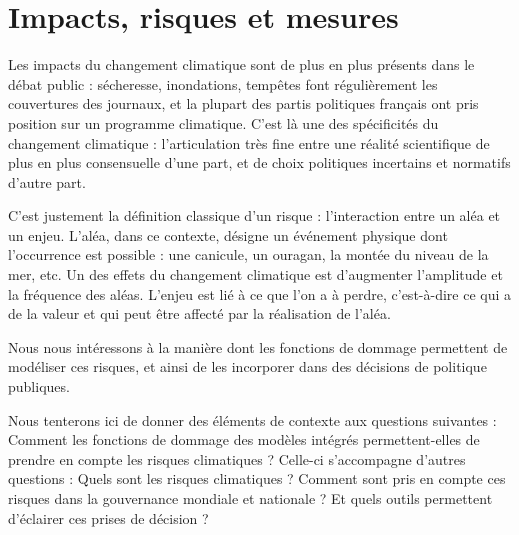 \chapter{Impacts, risques et mesures}
\label{chapter:introduction}
\newrefsegment


\newpage


Les impacts du changement climatique sont de plus en plus présents dans le débat public : sécheresse, inondations, tempêtes font régulièrement les couvertures des journaux, et la plupart des partis politiques français ont pris position sur un programme climatique. C'est là une des spécificités du changement climatique : l'articulation très fine entre une réalité scientifique de plus en plus consensuelle d'une part, et de choix politiques incertains et normatifs d'autre part. 


C'est justement la définition classique d'un risque : l'interaction entre un aléa et un enjeu. L'aléa, dans ce contexte, désigne un événement physique dont l'occurrence est possible : une canicule, un ouragan, la montée du niveau de la mer, etc. Un des effets du changement climatique est d'augmenter l'amplitude et la fréquence des aléas. L'enjeu est lié à ce que l'on a à perdre, c'est-à-dire ce qui a de la valeur et qui peut être affecté par la réalisation de l'aléa. 

Nous nous intéressons à la manière dont les fonctions de dommage permettent de modéliser ces risques, et ainsi de les incorporer dans des décisions de politique publiques. 



Nous tenterons ici de donner des éléments de contexte aux questions suivantes : 
Comment les fonctions de dommage des modèles intégrés permettent-elles de prendre en compte les risques climatiques ? Celle-ci s'accompagne d'autres questions : Quels sont les risques climatiques ? Comment sont pris en compte ces risques dans la gouvernance mondiale et nationale ? Et quels outils permettent d'éclairer ces prises de décision ? 




